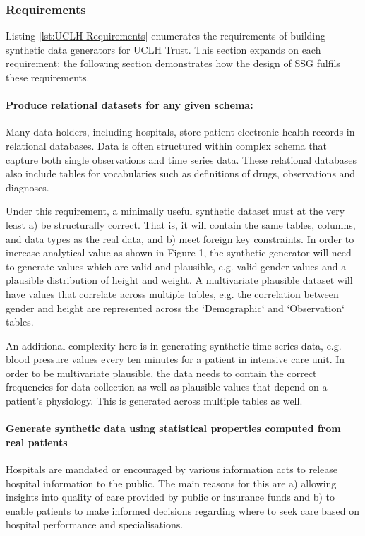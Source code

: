 \documentclass[11pt]{article}
\begin{document}
\subsubsection{Requirements}

Listing \ref{lst:UCLH Requirements} enumerates the requirements of building synthetic data generators for UCLH Trust. This section expands on each requirement; the following section demonstrates how the design of SSG fulfils these requirements.

\paragraph{Produce relational datasets for any given schema:}

Many data holders, including hospitals, store patient electronic health records in relational databases. Data is often structured within complex schema that capture both single observations and time series data. These relational databases also include tables for vocabularies such as definitions of drugs, observations and diagnoses. 

Under this requirement, a minimally useful synthetic dataset must at the very least a) be structurally correct. That is, it will contain the same tables, columns, and data types as the real data, and b) meet foreign key constraints. In order to increase analytical value as shown in Figure 1, the synthetic generator will need to generate values which are valid and plausible, e.g. valid gender values and a plausible distribution of height and weight.  A multivariate plausible dataset will have values that correlate across multiple tables, e.g. the correlation between gender and height are represented across the `Demographic` and `Observation` tables. 

An additional complexity here is in generating synthetic time series data, e.g. blood pressure values every ten minutes for a patient in intensive care unit. In order to be multivariate plausible, the data needs to contain the correct frequencies for data collection as well as plausible values that depend on a patient's physiology. This is generated across multiple tables as well.  

\paragraph{Generate synthetic data using statistical properties computed from real patients}
Hospitals are mandated or encouraged by various information acts to release hospital information to the public. The main reasons for this are a) allowing insights into quality of care provided by public or insurance funds and b) to enable patients to make informed decisions regarding where to seek care based on hospital performance and specialisations\cite{Werner2005}. 
\end{document}
